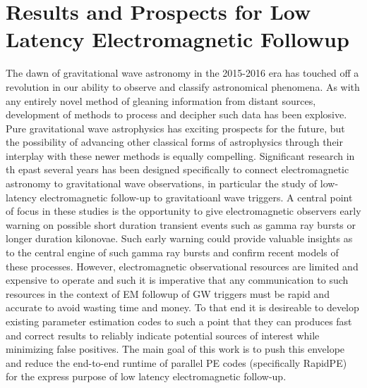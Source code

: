 \section{Results and Prospects for Low Latency Electromagnetic Followup}

The dawn of gravitational wave astronomy in the 2015-2016 era \cite{gw150914} has touched off a revolution in our ability to observe and classify astronomical phenomena. As with any entirely novel method of gleaning information from distant sources, development of methods to process and decipher such data has been explosive. Pure gravitational wave astrophysics has exciting prospects for the future, but the possibility of advancing other classical forms of astrophysics through their interplay with these newer methods is equally compelling. Significant research \cite{first2years} in th epast several years has been designed specifically to connect electromagnetic astronomy to gravitational wave observations, in particular the study of low-latency electromagnetic follow-up to gravitatioanl wave triggers. A central point of focus in these studies is the opportunity to give electromagnetic observers early warning on possible short duration transient events such as gamma ray bursts or longer duration kilonovae. Such early warning could provide valuable insights as to the central engine of such gamma ray bursts and confirm recent models of these processes. However, electromagnetic observational resources are limited and expensive to operate and such it is imperative that any communication to such resources in the context of EM followup of GW triggers must be rapid and accurate to avoid wasting time and money. To that end it is desireable to develop existing parameter estimation codes to such a point that they can produces fast and correct results to reliably indicate potential sources of interest while minimizing false positives. The main goal of this work is to push this envelope and reduce the end-to-end runtime of parallel PE codes (specifically RapidPE) for the express purpose of low latency electromagnetic follow-up.

